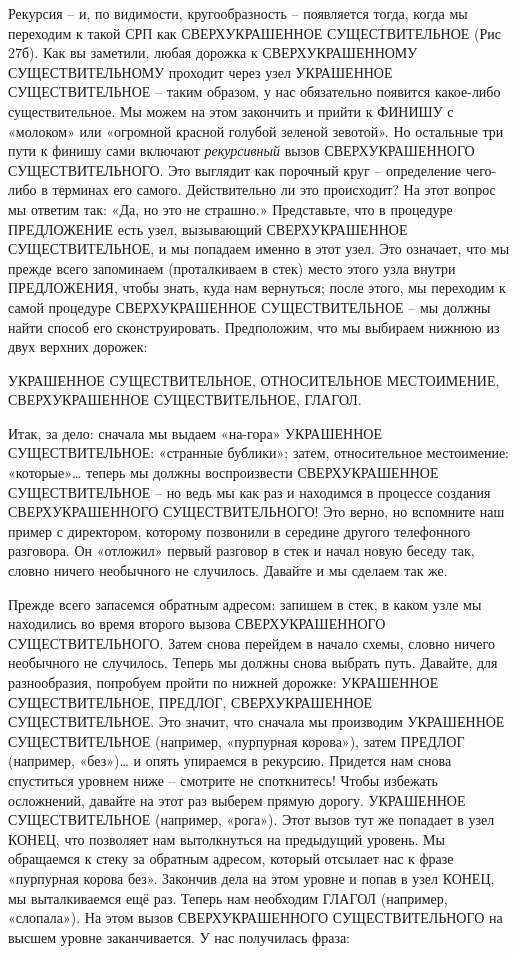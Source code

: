 \documentclass[../main.tex]{subfiles}
\begin{document}
Рекурсия \--- и, по видимости, кругообразность \--- появляется тогда, когда мы переходим к такой СРП как СВЕРХУКРАШЕННОЕ СУЩЕСТВИТЕЛЬНОЕ (Рис 27б). Как вы заметили, любая дорожка к СВЕРХУКРАШЕННОМУ СУЩЕСТВИТЕЛЬНОМУ проходит через узел УКРАШЕННОЕ СУЩЕСТВИТЕЛЬНОЕ \--- таким образом, у нас обязательно появится какое-либо существительное. Мы можем на этом закончить и прийти к ФИНИШУ с «молоком» или «огромной красной голубой зеленой зевотой». Но остальные три пути к финишу сами включают \emph{рекурсивный} вызов СВЕРХУКРАШЕННОГО СУЩЕСТВИТЕЛЬНОГО\@. Это выглядит как порочный круг \--- определение чего-либо в терминах его самого. Действительно ли это происходит? На этот вопрос мы ответим так: «Да, но это не страшно.» Представьте, что в процедуре ПРЕДЛОЖЕНИЕ есть узел, вызывающий СВЕРХУКРАШЕННОЕ СУЩЕСТВИТЕЛЬНОЕ, и мы попадаем именно в этот узел. Это означает, что мы прежде всего запоминаем (проталкиваем в стек) место этого узла внутри ПРЕДЛОЖЕНИЯ, чтобы знать, куда нам вернуться; после этого, мы переходим к самой процедуре СВЕРХУКРАШЕННОЕ СУЩЕСТВИТЕЛЬНОЕ \--- мы должны найти способ его сконструировать. Предположим, что мы выбираем нижнюю из двух верхних дорожек:

УКРАШЕННОЕ СУЩЕСТВИТЕЛЬНОЕ, ОТНОСИТЕЛЬНОЕ МЕСТОИМЕНИЕ, СВЕРХУКРАШЕННОЕ СУЩЕСТВИТЕЛЬНОЕ, ГЛАГОЛ.

Итак, за дело: сначала мы выдаем «на-гора» УКРАШЕННОЕ СУЩЕСТВИТЕЛЬНОЕ: «странные бублики»; затем, относительное местоимение: «которые»\ldots{} теперь мы должны воспроизвести СВЕРХУКРАШЕННОЕ СУЩЕСТВИТЕЛЬНОЕ \--- но ведь мы как раз и находимся в процессе создания СВЕРХУКРАШЕННОГО СУЩЕСТВИТЕЛЬНОГО! Это верно, но вспомните наш пример с директором, которому позвонили в середине другого телефонного разговора. Он «отложил» первый разговор в стек и начал новую беседу так, словно ничего необычного не случилось. Давайте и мы сделаем так же.

Прежде всего запасемся обратным адресом: запишем в стек, в каком узле мы находились во время второго вызова СВЕРХУКРАШЕННОГО СУЩЕСТВИТЕЛЬНОГО\@. Затем снова перейдем в начало схемы, словно ничего необычного не случилось. Теперь мы должны снова выбрать путь. Давайте, для разнообразия, попробуем пройти по нижней дорожке: УКРАШЕННОЕ СУЩЕСТВИТЕЛЬНОЕ, ПРЕДЛОГ, СВЕРХУКРАШЕННОЕ СУЩЕСТВИТЕЛЬНОЕ\@. Это значит, что сначала мы производим УКРАШЕННОЕ СУЩЕСТВИТЕЛЬНОЕ (например, «пурпурная корова»), затем ПРЕДЛОГ (например, «без»)\ldots{} и опять упираемся в рекурсию. Придется нам снова спуститься уровнем ниже \--- смотрите не споткнитесь! Чтобы избежать осложнений, давайте на этот раз выберем прямую дорогу. УКРАШЕННОЕ СУЩЕСТВИТЕЛЬНОЕ (например, «рога»). Этот вызов тут же попадает в узел КОНЕЦ, что позволяет нам вытолкнуться на предыдущий уровень. Мы обращаемся к стеку за обратным адресом, который отсылает нас к фразе «пурпурная корова без». Закончив дела на этом уровне и попав в узел КОНЕЦ, мы выталкиваемся ещё раз. Теперь нам необходим ГЛАГОЛ (например, «слопала»). На этом вызов СВЕРХУКРАШЕННОГО СУЩЕСТВИТЕЛЬНОГО на высшем уровне заканчивается. У нас получилась фраза:
\end{document}
